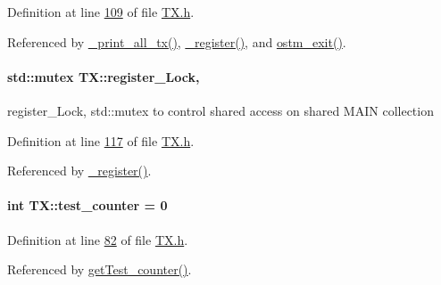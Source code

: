 Definition at line \hyperlink{_t_x_8h_source_l00109}{109} of file \hyperlink{_t_x_8h_source}{T\+X.\+h}.



Referenced by \hyperlink{_t_x_8cpp_source_l00311}{\+\_\+print\+\_\+all\+\_\+tx()}, \hyperlink{_t_x_8cpp_source_l00096}{\+\_\+register()}, and \hyperlink{_t_x_8cpp_source_l00068}{ostm\+\_\+exit()}.

\paragraph[{\texorpdfstring{register\+\_\+\+Lock}{register_Lock}}]{\setlength{\rightskip}{0pt plus 5cm}std\+::mutex T\+X\+::register\+\_\+\+Lock\hspace{0.3cm}{\ttfamily [static]}, {\ttfamily [private]}}\hypertarget{class_t_x_aa688a8c96fa3cdf8cd92e267463536dc_aa688a8c96fa3cdf8cd92e267463536dc}{}\label{class_t_x_aa688a8c96fa3cdf8cd92e267463536dc_aa688a8c96fa3cdf8cd92e267463536dc}
register\+\_\+\+Lock, std\+::mutex to control shared access on shared M\+A\+IN collection 

Definition at line \hyperlink{_t_x_8h_source_l00117}{117} of file \hyperlink{_t_x_8h_source}{T\+X.\+h}.



Referenced by \hyperlink{_t_x_8cpp_source_l00096}{\+\_\+register()}.

\paragraph[{\texorpdfstring{test\+\_\+counter}{test_counter}}]{\setlength{\rightskip}{0pt plus 5cm}int T\+X\+::test\+\_\+counter = 0\hspace{0.3cm}{\ttfamily [static]}}\hypertarget{class_t_x_a25838234aab99ae891a90eb8623a8b3c_a25838234aab99ae891a90eb8623a8b3c}{}\label{class_t_x_a25838234aab99ae891a90eb8623a8b3c_a25838234aab99ae891a90eb8623a8b3c}


Definition at line \hyperlink{_t_x_8h_source_l00082}{82} of file \hyperlink{_t_x_8h_source}{T\+X.\+h}.



Referenced by \hyperlink{_t_x_8cpp_source_l00287}{get\+Test\+\_\+counter()}.

